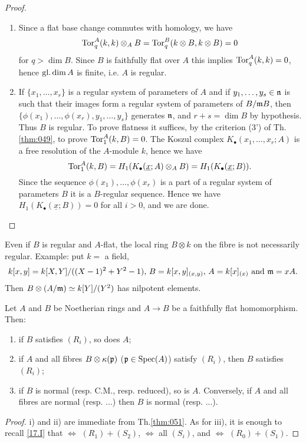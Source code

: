\documentclass[../main]{subfiles}
\begin{document}
\begin{proof}
\begin{enumerate}
    \item Since a flat base change commutes with homology, we have \[\operatorname{Tor}_q^A(k, k) \otimes_A B = \operatorname{Tor}_q^B (k \otimes B, k \otimes B) = 0\] for $q > \dim B$. Since $B$ is faithfully flat over $A$ this implies $\operatorname{Tor}_q^A(k, k) = 0$, hence $\operatorname{gl. dim} A$ is finite, i.e. $A$ is regular. 
    \item If $\{x_1, \ldots, x_r\}$ is a regular system of parameters of $A$ and if $y_1, \dots, y_s \in \mathfrak{n}$ is such that their images form a regular system of parameters of $B/\mathfrak{m} B$, then $\{\phi(x_1), \ldots, \phi(x_r), y_1, \ldots, y_s\}$ generates $\mathfrak{n}$, and $r + s = \dim B$ by hypothesis. Thus $B$ is regular. To prove flatness it suffices, by the criterion (3') of Th.\ref{thm:049}, to prove $\operatorname{Tor}_1^A(k, B) = 0$. The Koszul complex $K_\bullet(x_1, \ldots, x_r; A)$ is a free resolution of the $A$-module $k$, hence we have \[\operatorname{Tor}_1^A(k, B) = H_1 (K_\bullet(\underline x; A) \otimes_A B) = H_1(K_\bullet(\underline x; B)).\] Since the sequence $\phi(x_1), \ldots, \phi(x_r)$ is a part of a regular system of parameters $B$ it is a $B$-regular sequence. Hence we have $H_1(K_\bullet(\underline x; B)) = 0$ for all $i > 0$, and we are done.
\end{enumerate}
\end{proof}

\begin{remark}
Even if $B$ is regular and $A$-flat, the local ring $B \otimes k$ on the fibre is not necessarily regular. Example: put $k = $ a field, \[k[x, y] = k[X, Y]/((X - 1)^2 + Y^2 - 1),\, B = k[x,y]_{(x, y)},\, A = k[x]_{(x)}\text{ and }\mathfrak{m} = x A.\] Then $B \otimes (A/\mathfrak{m}) \simeq k[Y]/(Y^2)$ has nilpotent elements.
\end{remark}

\begin{parcorollary}
Let $A$ and $B$ be Noetherian rings and $A \longrightarrow B$ be a faithfully flat homomorphism. Then: 

\begin{enumerate}[label=\roman*)]
    \item if $B$ satisfies $(R_i)$, so does $A$;
    \item if $A$ and all fibres $B \otimes \kappa(\mathfrak{p})$ ($\mathfrak{p} \in \operatorname{Spec}(A)$) satisfy $(R_i)$, then $B$ satisfies $(R_i)$;
    \item if $B$ is normal (resp. C.M., resp. reduced), so is $A$. Conversely, if $A$ and all fibres are normal (resp. ...) then $B$ is normal (resp. ...).
\end{enumerate}
\end{parcorollary}

\begin{proof}
i) and ii) are immediate from Th.\ref{thm:051}. As for iii), it is enough to recall \ref{17.I} that  $\iff$ $(R_1) + (S_2)$,  $\iff$ all $(S_i)$, and  $\iff$ $(R_0) + (S_1)$.
\end{proof}
\end{document}

